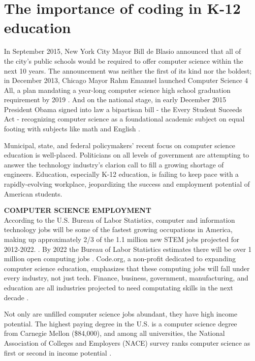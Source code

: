 \section{The importance of coding in K-12 education}
In September 2015, New York City Mayor Bill de Blasio announced that all of the city’s public schools would be required to offer computer science within the next 10 years. The announcement was neither the first of its kind nor the boldest; in December 2013, Chicago Mayor Rahm Emanuel launched Computer Science 4 All, a plan mandating a year-long computer science high school graduation requirement by 2019 \cite{chicagoCS}. And on the national stage, in early December 2015 President Obama signed into law a bipartisan bill - the Every Student Suceeds Act - recognizing computer science as a foundational academic subject on equal footing with subjects like math and English \cite{WSJref}. \par
Municipal, state, and federal policymakers' recent focus on computer science education is well-placed. Politicians on all levels of government are attempting to answer the technology industry's clarion call to fill a growing shortage of engineers. Education, especially K-12 education, is failing to keep pace with a rapidly-evolving workplace, jeopardizing the success and employment potential of American students. \par
\textbf{COMPUTER SCIENCE EMPLOYMENT} \\
According to the U.S. Bureau of Labor Statistics, computer and information technology jobs will be some of the fastest growing occupations in America, making up approximately 2/3 of the 1.1 million new STEM jobs projected for 2012-2022. \cite{laborstats}. By 2022 the Bureau of Labor Statistics estimates there will be over 1 million open computing jobs \cite{laborstats}. Code.org, a non-profit dedicated to expanding computer science education, emphasizes that these computing jobs will fall under every industry, not just tech. Finance, business, government, manufacturing, and education are all industries projected to need computating skills in the next decade \cite{codeorgstats}.\par
Not only are unfilled computer science jobs abundant, they have high income potential. The highest paying degree in the U.S. is a computer science degree from Carnegie Mellon (\$84,000), and among all universities, the National Association of Colleges and Employers (NACE) survey ranks computer science as first or second in income potential \cite{forbeshigh}. \par
